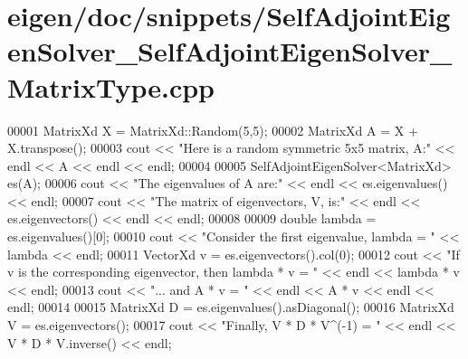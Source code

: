 \hypertarget{eigen_2doc_2snippets_2_self_adjoint_eigen_solver___self_adjoint_eigen_solver___matrix_type_8cpp_source}{}\section{eigen/doc/snippets/\+Self\+Adjoint\+Eigen\+Solver\+\_\+\+Self\+Adjoint\+Eigen\+Solver\+\_\+\+Matrix\+Type.cpp}
\label{eigen_2doc_2snippets_2_self_adjoint_eigen_solver___self_adjoint_eigen_solver___matrix_type_8cpp_source}

\begin{DoxyCode}
00001 MatrixXd X = MatrixXd::Random(5,5);
00002 MatrixXd A = X + X.transpose();
00003 cout << \textcolor{stringliteral}{"Here is a random symmetric 5x5 matrix, A:"} << endl << A << endl << endl;
00004 
00005 SelfAdjointEigenSolver<MatrixXd> es(A);
00006 cout << \textcolor{stringliteral}{"The eigenvalues of A are:"} << endl << es.eigenvalues() << endl;
00007 cout << \textcolor{stringliteral}{"The matrix of eigenvectors, V, is:"} << endl << es.eigenvectors() << endl << endl;
00008 
00009 \textcolor{keywordtype}{double} lambda = es.eigenvalues()[0];
00010 cout << \textcolor{stringliteral}{"Consider the first eigenvalue, lambda = "} << lambda << endl;
00011 VectorXd v = es.eigenvectors().col(0);
00012 cout << \textcolor{stringliteral}{"If v is the corresponding eigenvector, then lambda * v = "} << endl << lambda * v << endl;
00013 cout << \textcolor{stringliteral}{"... and A * v = "} << endl << A * v << endl << endl;
00014 
00015 MatrixXd D = es.eigenvalues().asDiagonal();
00016 MatrixXd V = es.eigenvectors();
00017 cout << \textcolor{stringliteral}{"Finally, V * D * V^(-1) = "} << endl << V * D * V.inverse() << endl;
\end{DoxyCode}
